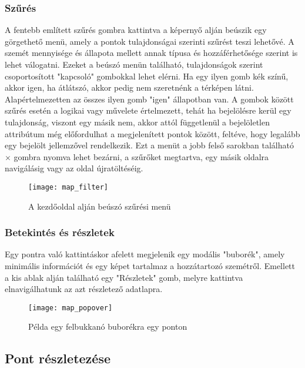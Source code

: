 \subsubsection{Szűrés}

A fentebb említett szűrés gombra kattintva a képernyő alján beúszik egy görgethető menü, amely a pontok tulajdonságai szerinti szűrést teszi lehetővé. A szemét mennyisége és állapota mellett annak típusa és hozzáférhetősége szerint is lehet válogatni. Ezeket a beúszó menün található, tulajdonságok szerint csoportosított "kapcsoló" gombokkal lehet elérni. Ha egy ilyen gomb kék színű, akkor igen, ha átlátszó, akkor pedig nem szeretnénk a térképen látni. Alapértelmezetten az összes ilyen gomb "igen" állapotban van. A gombok között szűrés esetén a logikai vagy művelete értelmezett, tehát ha bejelölésre kerül egy tulajdonság, viszont egy másik nem, akkor attól függetlenül a bejelöletlen attribútum még előfordulhat a megjelenített pontok között, feltéve, hogy legalább egy bejelölt jellemzővel rendelkezik. Ezt a menüt a jobb felső sarokban található \hspace{0.1cm}\boldmath\(\times\)\hspace{0.1cm} gombra nyomva lehet bezárni, a szűrőket megtartva, egy másik oldalra navigálásig vagy az oldal újratöltéséig.

\begin{figure}[H]
	\centering
	\texttt{[image: map\_filter]}
	\caption{A kezdőoldal alján beúszó szűrési menü}
	\label{fig:map_filter}
\end{figure}

\subsubsection{Betekintés és részletek}

Egy pontra való kattintáskor afelett megjelenik egy modális "buborék", amely minimális információt és egy képet tartalmaz a hozzátartozó szemétről. Emellett a kis ablak alján található egy "Részletek" gomb, melyre kattintva elnavigálhatunk az azt részletező adatlapra.

\begin{figure}[H]
	\centering
	\texttt{[image: map\_popover]}
	\caption{Példa egy felbukkanó buborékra egy ponton}
	\label{fig:map_popover}
\end{figure}

\subsection{Pont részletezése}

